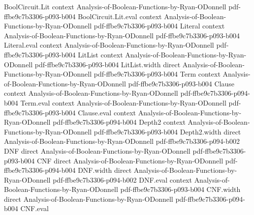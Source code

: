 \begin{theorem}
\leanok
{}
\proofstep
  {BoolCircuit.Lit}
  {context}
  {Analysis-of-Boolean-Functions-by-Ryan-ODonnell}
  {pdf-ffbe9c7b3306-p093-b004}
\proofstep
  {BoolCircuit.Lit.eval}
  {context}
  {Analysis-of-Boolean-Functions-by-Ryan-ODonnell}
  {pdf-ffbe9c7b3306-p093-b004}
\proofstep
  {Literal}
  {context}
  {Analysis-of-Boolean-Functions-by-Ryan-ODonnell}
  {pdf-ffbe9c7b3306-p093-b004}
\proofstep
  {Literal.eval}
  {context}
  {Analysis-of-Boolean-Functions-by-Ryan-ODonnell}
  {pdf-ffbe9c7b3306-p093-b004}
\proofstep
  {LitList}
  {context}
  {Analysis-of-Boolean-Functions-by-Ryan-ODonnell}
  {pdf-ffbe9c7b3306-p093-b004}
\proofstep
  {LitList.width}
  {direct}
  {Analysis-of-Boolean-Functions-by-Ryan-ODonnell}
  {pdf-ffbe9c7b3306-p093-b004}
\proofstep
  {Term}
  {context}
  {Analysis-of-Boolean-Functions-by-Ryan-ODonnell}
  {pdf-ffbe9c7b3306-p093-b004}
\proofstep
  {Clause}
  {context}
  {Analysis-of-Boolean-Functions-by-Ryan-ODonnell}
  {pdf-ffbe9c7b3306-p094-b004}
\proofstep
  {Term.eval}
  {context}
  {Analysis-of-Boolean-Functions-by-Ryan-ODonnell}
  {pdf-ffbe9c7b3306-p093-b004}
\proofstep
  {Clause.eval}
  {context}
  {Analysis-of-Boolean-Functions-by-Ryan-ODonnell}
  {pdf-ffbe9c7b3306-p094-b004}
\proofstep
  {Depth2}
  {context}
  {Analysis-of-Boolean-Functions-by-Ryan-ODonnell}
  {pdf-ffbe9c7b3306-p093-b004}
\proofstep
  {Depth2.width}
  {direct}
  {Analysis-of-Boolean-Functions-by-Ryan-ODonnell}
  {pdf-ffbe9c7b3306-p094-b002}
\proofstep
  {DNF}
  {direct}
  {Analysis-of-Boolean-Functions-by-Ryan-ODonnell}
  {pdf-ffbe9c7b3306-p093-b004}
\proofstep
  {CNF}
  {direct}
  {Analysis-of-Boolean-Functions-by-Ryan-ODonnell}
  {pdf-ffbe9c7b3306-p094-b004}
\proofstep
  {DNF.width}
  {direct}
  {Analysis-of-Boolean-Functions-by-Ryan-ODonnell}
  {pdf-ffbe9c7b3306-p094-b002}
\proofstep
  {DNF.eval}
  {context}
  {Analysis-of-Boolean-Functions-by-Ryan-ODonnell}
  {pdf-ffbe9c7b3306-p093-b004}
\proofstep
  {CNF.width}
  {direct}
  {Analysis-of-Boolean-Functions-by-Ryan-ODonnell}
  {pdf-ffbe9c7b3306-p094-b004}
\proofstep
  {CNF.eval}

\end{theorem}
